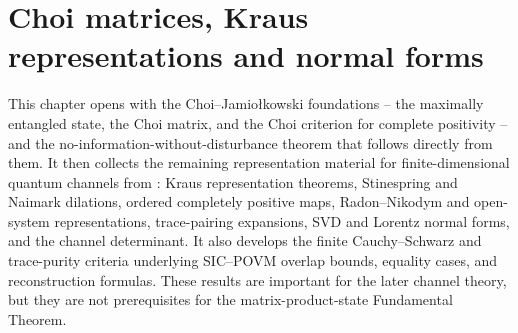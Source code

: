 \chapter{Choi matrices, Kraus representations and normal forms}\label{ch:channel_representations}

This chapter opens with the Choi--Jamio\l{}kowski foundations -- the
maximally entangled state, the Choi matrix, and the Choi criterion for
complete positivity -- and the no-information-without-disturbance theorem
that follows directly from them. It then collects the remaining
representation material for finite-dimensional quantum channels from
\cite[Chapter~2]{Wolf2012Quantum}: Kraus representation theorems,
Stinespring and Naimark dilations, ordered completely positive maps,
Radon--Nikodym and open-system representations, trace-pairing expansions,
SVD and Lorentz normal forms, and the channel determinant. It also develops
the finite Cauchy--Schwarz and trace-purity criteria underlying SIC--POVM
overlap bounds, equality cases, and reconstruction formulas. These results
are important for the later channel theory, but they are not prerequisites
for the matrix-product-state Fundamental Theorem.















